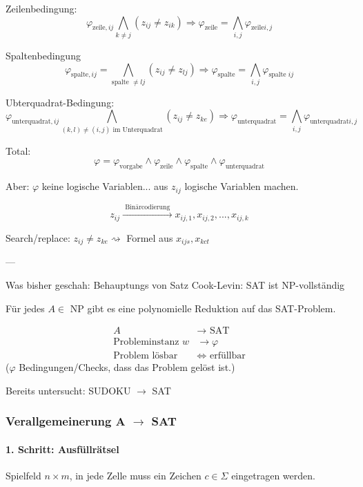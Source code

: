 Zeilenbedingung: \[
	\varphi_{\text{zeile}, ij}   \bigwedge_{k \neq j} (z_{ij} \neq z_{ik}) \Rightarrow \varphi_\text{zeile} = \bigwedge_{i,j} \varphi_{\text{zeile} i,j}
\]

Spaltenbedingung \[
	\varphi_{\text{spalte}, ij} = \bigwedge_{\text{spalte }\neq lj} (z_{ij} \neq z_{lj}) \Rightarrow \varphi_\text{spalte} = \bigwedge_{i,j} \varphi_{\text{spalte } ij}
\]


Ubterquadrat-Bedingung: \[
\varphi_{\text{unterquadrat}, ij}   \bigwedge_{(k,l) \neq (i,j) \text{ im Unterquadrat}} (z_{ij} \neq z_{ke}) \Rightarrow \varphi_\text{unterquadrat} = \bigwedge_{i,j} \varphi_{\text{unterquadrat} i,j}
\]


Total: \[
	\varphi = \varphi_\text{vorgabe} \land  \varphi_\text{zeile} \land  \varphi_\text{spalte} \land  \varphi_\text{unterquadrat} 
\]

Aber: $\varphi$ keine logische Variablen... aus $z_{ij}$ logische Variablen machen.

\[
	z_{ij} \xrightarrow{\text{ Binärcodierung }} x_{ij,1}, x_{ij,2},  ..., x_{ij,k}
	\]
	
Search/replace: $z_{ij} \neq z_{ke} \rightsquigarrow$ Formel aus $x_{ijs}, x_{kct}$


\----

Was bisher geschah: Behauptungs von Satz Cook-Levin: SAT ist NP-vollständig

Für jedes $A  \in $ NP gibt es eine polynomielle Reduktion auf das SAT-Problem. 

\begin{align*}
A &\longrightarrow \text{ SAT} \\
\text{Probleminstanz } w &\longrightarrow \varphi \\
\text{Problem lösbar} & \Leftrightarrow \text{ erfüllbar}
\end{align*}
($\varphi$ Bedingungen/Checks, dass das Problem gelöst ist.)

Bereits untersucht: SUDOKU $\longrightarrow$ SAT

\subsubsection{Verallgemeinerung A $\longrightarrow$ SAT}

\paragraph{1. Schritt: Ausfüllrätsel} Spielfeld $n \times m$, in jede Zelle muss ein Zeichen $c \in \Sigma$ eingetragen werden.

